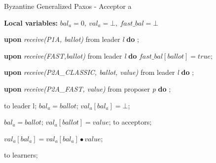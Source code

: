 \begin{algorithm}
\begin{algorithmic}[1]
		\iffalse \State
		\Function{proved\_safe}{Q, m}
		\State $k = max(i\ |\ (i < m) \wedge (\exists a \in Q :\ val_a[i]\ \neq null))$;
		\State $RS = \{R \in k$-$quorum\ |\ \forall a \in R \cap Q : val_a[k] \neq null\}$;
		\State $\gamma(R) = \sqcap \{v_a[k]\ |\ a \in Q \cap R \}$;
		\State $\Gamma = \{\gamma(R)\ |\ R \in RS \}$;
		\State
		\If{$RS = \varnothing$}
		\State \textbf{return} $\{val_a[k]\ |\ (a \in Q) \wedge (val_a[k] \neq null)\}$;
		\Else
		\State \textbf{return} $\sqcup \Gamma$;
		\EndIf
		\EndFunction
		\fi
		
	\end{algorithmic}
\end{algorithm}

\begin{algorithm} 
	\caption{Byzantine Generalized Paxos - Acceptor a}
	\label{BFT-Acc}
	\textbf{Local variables:} $bal_a = 0,\ val_a = \bot,\ fast\_bal = \bot$ 
	\begin{algorithmic}[1]
		\State \textbf{upon} \textit{receive(P1A, ballot)} from leader \textit{l} \textbf{do}
		\State \hspace{\algorithmicindent} ;
		
		\State
		\State \textbf{upon} \textit{receive(FAST,ballot)} from leader \textit{l} \textbf{do}
		\State \hspace{\algorithmicindent} $fast\_bal[ballot] = true$;
		
		\State
		\State \textbf{upon} \textit{receive(P2A\_CLASSIC, ballot, value)} from leader \textit{l} \textbf{do}
		\State \hspace{\algorithmicindent} ; 

		\State		
		\State \textbf{upon} \textit{receive(P2A\_FAST, value)} from proposer \textit{p} \textbf{do}
		\State \hspace{\algorithmicindent} ;
				
		\State
		\State {} to leader l;
		\State $bal_a = ballot$;	
		\State $val_a[bal_a] = \bot$;	
		\EndIf
		\EndFunction
	
		\State
		\State $bal_a = ballot$;
		\State $val_a[ballot] = value$;
		\State {} to acceptors;
		\EndIf
		\EndFunction
		
		\State
		\State $val_a[bal_a] =  val_a[bal_a] \bullet value$;

		\State {} to learners;
		\EndIf
		\EndFunction
	\end{algorithmic}
\end{algorithm}


